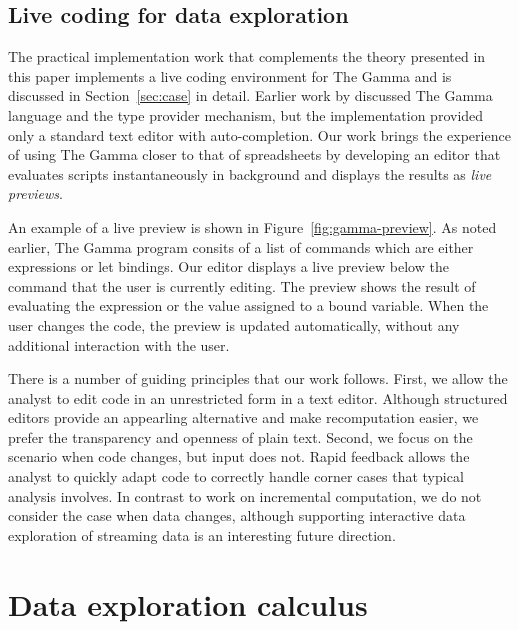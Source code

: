 \documentclass[acmsmall,anonymous,fleqn]{acmart}\settopmatter{printfolios=false,printccs=false,printacmref=false}
\theoremstyle{plain}
\theoremstyle{definition}
\begin{document}

\subsection{Live coding for data exploration}

The practical implementation work that complements the theory presented in this paper implements a live
coding environment for The Gamma and is discussed in Section~\ref{sec:case} in detail. Earlier work by
\citet{gamma} discussed The Gamma language and the type provider mechanism, but the implementation
provided only a standard text editor with auto-completion. Our work brings the experience of using
The Gamma closer to that of spreadsheets by developing an editor that evaluates scripts
instantaneously in background and displays the results as \emph{live previews}.

An example of a live preview is shown in Figure~\ref{fig:gamma-preview}. As noted earlier, The
Gamma program consits of a list of commands which are either expressions or let bindings. Our
editor displays a live preview below the command that the user is currently editing. The preview
shows the result of evaluating the expression or the value assigned to a bound variable. When the
user changes the code, the preview is updated automatically, without any additional interaction
with the user.

There is a number of guiding principles that our work follows. First, we allow the analyst
to edit code in an unrestricted form in a text editor. Although structured editors provide an
appearling alternative and make recomputation easier, we prefer the transparency
and openness of plain text. Second, we focus on the scenario when code changes, but input
does not. Rapid feedback allows the analyst to quickly adapt code to correctly handle
corner cases that typical analysis involves. In contrast to work on incremental computation,
we do not consider the case when data changes, although supporting interactive data exploration
of streaming data is an interesting future direction.


\section{Data exploration calculus}
\label{sec:calculus}
\end{document}

